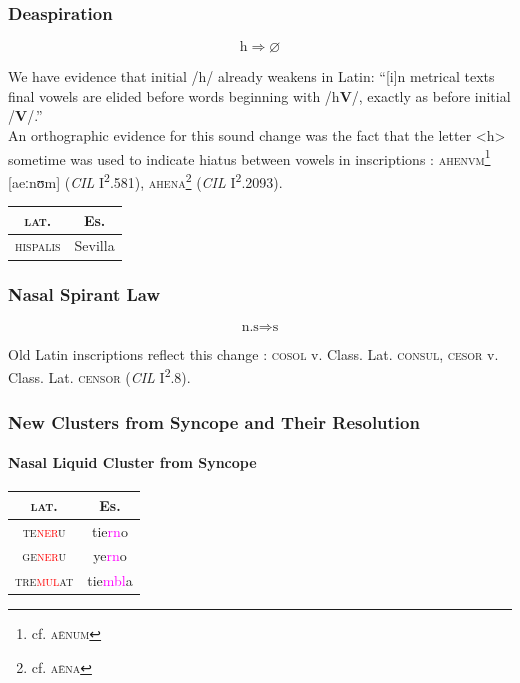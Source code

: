 \documentclass{report}[12pt]
\begin{document}
\subsubsection{Deaspiration}

\begin{tcolorbox}
  \[ \text{h} \Rightarrow \varnothing \]
\end{tcolorbox}

We have evidence that initial /h/ already weakens in Latin: ``[i]n metrical texts final vowels are elided before words beginning with /h\textbf{V}/, exactly as before initial /\textbf{V}/.'' \parencite[p.~87]{companion_to_latin} \\
An orthographic evidence for this sound change was the fact that the letter <h> sometime was used to indicate hiatus between vowels in inscriptions \parencite[p.~18]{companion_to_latin}: \textsc{ahenvm}\footnote{cf. \textsc{a\={e}num}} [aeːnʊm] (\emph{CIL} I\textsuperscript{2}.581), \textsc{ahena}\footnote{cf. \textsc{a\={e}na}} (\emph{CIL} I\textsuperscript{2}.2093).

\begin{tabular}{c c}
  \textsc{lat.} & Es. \\
  \hline
  \textsc{hispalis} & Sevilla
\end{tabular}

\subsubsection{Nasal Spirant Law}

\begin{tcolorbox}
  \[ \text{n.s} \Rightarrow \text{s} \]
\end{tcolorbox}

Old Latin inscriptions reflect this change \parencite[p.~17]{companion_to_latin}: \textsc{cosol} v. Class. Lat. \textsc{consul}, \textsc{cesor} v. Class. Lat. \textsc{censor} (\emph{CIL} I\textsuperscript{2}.8).

\subsubsection{New Clusters from Syncope and Their Resolution}

\paragraph*{Nasal Liquid Cluster from Syncope}

\begin{center}
  \begin{tabular}{c c}
    \textsc{lat.} & Es. \\
    \hline
    \textsc{te\textcolor{red}{ner}u} & tie\textcolor{magenta}{rn}o \\
    \textsc{ge\textcolor{red}{ner}u} & ye\textcolor{magenta}{rn}o \\
    \textsc{tre\textcolor{red}{mul}at} & tie\textcolor{magenta}{mbl}a \\
  \end{tabular}
\end{center}
\end{document}
